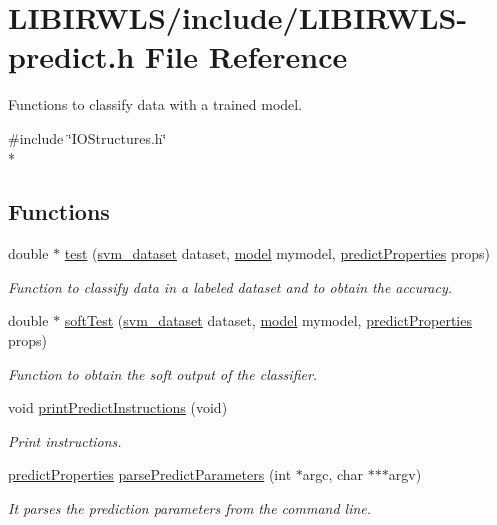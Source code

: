 \hypertarget{LIBIRWLS-predict_8h}{}\section{L\+I\+B\+I\+R\+W\+L\+S/include/\+L\+I\+B\+I\+R\+W\+L\+S-\/predict.h File Reference}
\label{LIBIRWLS-predict_8h}


Functions to classify data with a trained model.  


{\ttfamily \#include \char`\"{}I\+O\+Structures.\+h\char`\"{}}\\*
\subsection*{Functions}
\begin{DoxyCompactItemize}
\item 
double $\ast$ \hyperlink{LIBIRWLS-predict_8h_ae3fc6988def0487bb4bb47b759ba3d0b}{test} (\hyperlink{structsvm__dataset}{svm\+\_\+dataset} dataset, \hyperlink{structmodel}{model} mymodel, \hyperlink{structpredictProperties}{predict\+Properties} props)
\begin{DoxyCompactList}\small\item\em Function to classify data in a labeled dataset and to obtain the accuracy. \end{DoxyCompactList}\item 
double $\ast$ \hyperlink{LIBIRWLS-predict_8h_a47a2cacfccb7e9f9ef8b273b5d5a7498}{soft\+Test} (\hyperlink{structsvm__dataset}{svm\+\_\+dataset} dataset, \hyperlink{structmodel}{model} mymodel, \hyperlink{structpredictProperties}{predict\+Properties} props)
\begin{DoxyCompactList}\small\item\em Function to obtain the soft output of the classifier. \end{DoxyCompactList}\item 
void \hyperlink{LIBIRWLS-predict_8h_ab8c1148238200e9d917c15c40e1fe7e5}{print\+Predict\+Instructions} (void)
\begin{DoxyCompactList}\small\item\em Print instructions. \end{DoxyCompactList}\item 
\hyperlink{structpredictProperties}{predict\+Properties} \hyperlink{LIBIRWLS-predict_8h_a186e63263bf147110137e90adafcb8c7}{parse\+Predict\+Parameters} (int $\ast$argc, char $\ast$$\ast$$\ast$argv)
\begin{DoxyCompactList}\small\item\em It parses the prediction parameters from the command line. \end{DoxyCompactList}\end{DoxyCompactItemize}


